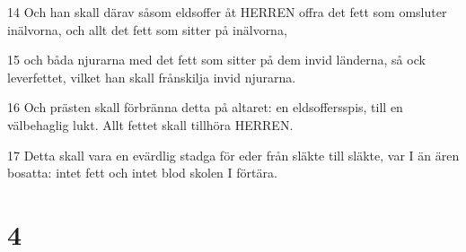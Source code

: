 \par 14 Och han skall därav såsom eldsoffer åt HERREN offra det fett som omsluter inälvorna, och allt det fett som sitter på inälvorna,
\par 15 och båda njurarna med det fett som sitter på dem invid länderna, så ock leverfettet, vilket han skall frånskilja invid njurarna.
\par 16 Och prästen skall förbränna detta på altaret: en eldsoffersspis, till en välbehaglig lukt. Allt fettet skall tillhöra HERREN.
\par 17 Detta skall vara en evärdlig stadga för eder från släkte till släkte, var I än ären bosatta: intet fett och intet blod skolen I förtära.

\chapter{4}

